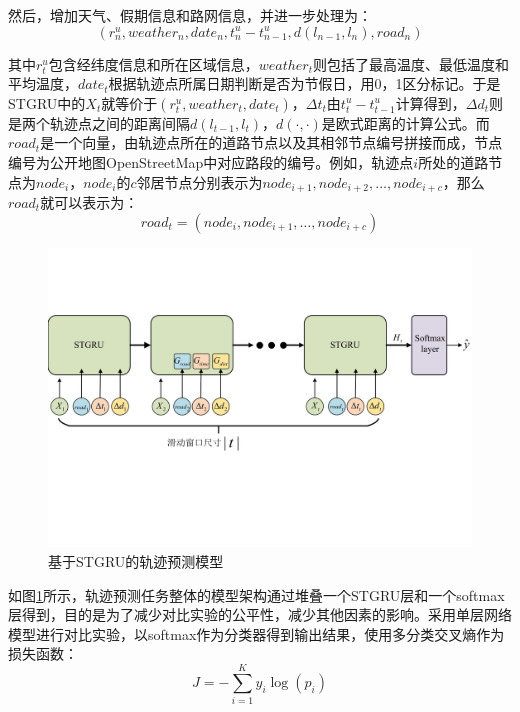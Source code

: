 \documentclass[master]{thesis-uestc}
\begin{document}
然后，增加天气、假期信息和路网信息，并进一步处理为：
\begin{equation}
(r^u_n,weather_n,date_n,t^u_n-t^u_{n-1},d(l_{n-1},l_n),road_n)
\end{equation}

其中$r^u_t$包含经纬度信息和所在区域信息，$weather_t$则包括了最高温度、最低温度和平均温度，$date_t$根据轨迹点所属日期判断是否为节假日，用0，1区分标记。于是STGRU中的$X_t$就等价于$(r^u_t,weather_t,date_t)$，$\Delta t_t$由$t^u_t-t^u_{t-1}$计算得到，$\Delta d_t$则是两个轨迹点之间的距离间隔$d(l_{t-1}, l_{t})$，$d(\cdot,\cdot)$是欧式距离的计算公式。而$road_t$是一个向量，由轨迹点所在的道路节点以及其相邻节点编号拼接而成，节点编号为公开地图OpenStreetMap中对应路段的编号。例如，轨迹点$i$所处的道路节点为$node_i$，$node_i$的$c$邻居节点分别表示为$node_{i+1},node_{i+2},\dots,node_{i+c}$，那么$road_t$就可以表示为：
\begin{equation}
road_t = (node_{i},node_{i+1},\dots,node_{i+c})
\end{equation}

\begin{figure}[!ht]
\centering
\includegraphics[width=1.0\linewidth]{./pic/stgru_all_4.pdf}
\caption{基于STGRU的轨迹预测模型}
\label{Figure.3.1}
\end{figure}

如图\ref{Figure.3.1}所示，轨迹预测任务整体的模型架构通过堆叠一个STGRU层和一个softmax层得到，目的是为了减少对比实验的公平性，减少其他因素的影响。采用单层网络模型进行对比实验，以softmax作为分类器得到输出结果，使用多分类交叉熵作为损失函数：
\begin{equation}
J = -\sum_{i=1}^{K}y_i\log (p_i)
\end{equation}
\end{document}
